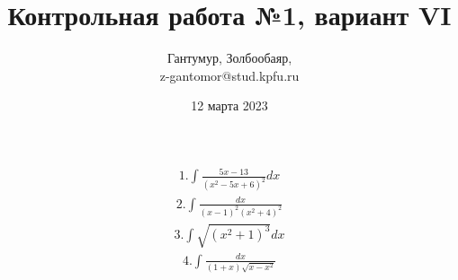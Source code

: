 \documentclass{article}
\author{
	Гантумур, Золбообаяр,\\
	z-gantomor@stud.kpfu.ru
}
\title{Контрольная работа №1, вариант VI}
\date{12 марта 2023}
\begin{document}
	\maketitle
	\begin{align}
	1. \int \frac{5x-13}{(x^2-5x+6)^2} dx
	\end{align}
	\begin{align}
	2. \int \frac{dx}{(x-1)^2(x^2+4)^2}
	\end{align}
	\begin{align}
	3. \int \sqrt{(x^2+1)^3} dx
	\end{align}
	\begin{align}
	4. \int \frac{dx}{(1+x)\sqrt{x-x^2}}
	\end{align}
\end{document}
